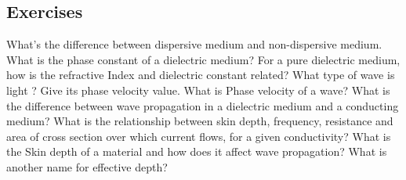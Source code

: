 \begin{mdframed}[backgroundcolor=lightblue, linewidth=1pt,  hidealllines=true]
\section{Exercises}
\begin{ExerciseList}
\Exercise[label={ex261}] What's the difference between dispersive medium and non-dispersive medium.
\Exercise[label={ex262}] What is the phase constant of a dielectric medium?
\Exercise[label={ex263}] For a pure dielectric medium, how is the refractive Index and dielectric constant related?
\Exercise[label={ex264}] What type of wave is light ? Give its phase velocity value.
\Exercise[label={ex265}] What is Phase velocity of a wave?
\Exercise[label={ex266}] What is the difference between wave propagation in a dielectric medium and a conducting medium?
\Exercise[label={ex267}] What is the relationship between skin depth, frequency, resistance and area of cross section over which current flows, for a given conductivity?
\Exercise[label={ex268}] What is the Skin depth of a material and how does it affect wave propagation?
\Exercise[label={ex269}] What is another name for effective depth?
\end{ExerciseList}
\end{mdframed}
